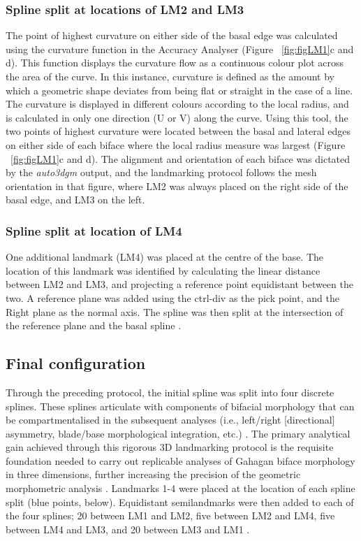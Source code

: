 \documentclass[review]{elsarticle}
\begin{document}
\subsubsection*{Spline split at locations of LM2 and LM3}

The point of highest curvature on either side of the basal edge was calculated using the curvature function in the Accuracy Analyser (Figure ~\ref{fig:figLM1}c and d). This function displays the curvature flow as a continuous colour plot across the area of the curve. In this instance, curvature is defined as the amount by which a geometric shape deviates from being flat or straight in the case of a line. The curvature is displayed in different colours according to the local radius, and is calculated in only one direction (U or V) along the curve. Using this tool, the two points of highest curvature were located between the basal and lateral edges on either side of each biface where the local radius measure was largest (Figure ~\ref{fig:figLM1}c and d). The alignment and orientation of each biface was dictated by the \textit{auto3dgm} output, and the landmarking protocol follows the mesh orientation in that figure, where LM2 was always placed on the right side of the basal edge, and LM3 on the left.

\subsubsection*{Spline split at location of LM4}

One additional landmark (LM4) was placed at the centre of the base. The location of this landmark was identified by calculating the linear distance between LM2 and LM3, and projecting a reference point equidistant between the two. A reference plane was added using the ctrl-div as the pick point, and the Right plane as the normal axis. The spline was then split at the intersection of the reference plane and the basal spline \citep{RN20850}.

\subsection*{Final configuration}

Through the preceding protocol, the initial spline was split into four discrete splines. These splines articulate with components of bifacial morphology that can be compartmentalised in the subsequent analyses (i.e., left/right [directional] asymmetry, blade/base morphological integration, etc.) \citep{RN20850}. The primary analytical gain achieved through this rigorous 3D landmarking protocol is the requisite foundation needed to carry out replicable analyses of Gahagan biface morphology in three dimensions, further increasing the precision of the geometric morphometric analysis \citep{RN20850}. Landmarks 1-4 were placed at the location of each spline split (blue points, below). Equidistant semilandmarks were then added to each of the four splines; 20 between LM1 and LM2, five between LM2 and LM4, five between LM4 and LM3, and 20 between LM3 and LM1 \citep{RN20850}.
\end{document}
